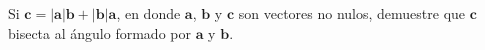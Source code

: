 \item Si $\mathbf{c} = |\mathbf{a}|\mathbf{b} + |\mathbf{b}|\mathbf{a}$, en donde $\mathbf{a}$, $\mathbf{b}$ y $\mathbf{c}$ son vectores no nulos, demuestre que $\mathbf{c}$ bisecta al ángulo formado por $\mathbf{a}$ y $\mathbf{b}$.
